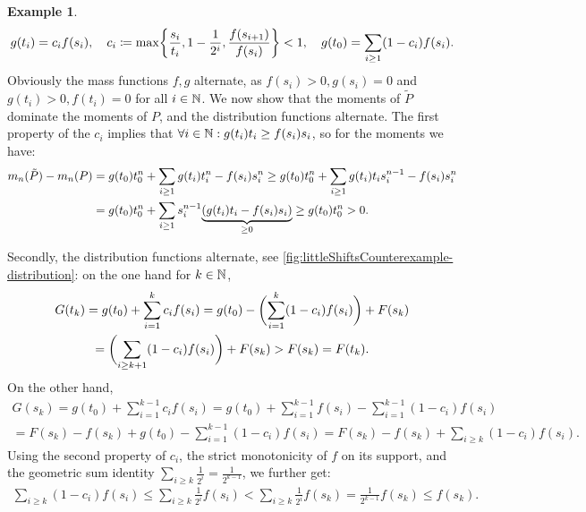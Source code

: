 \documentclass[a4paper]{scrreprt}
\theoremstyle{definition}
\newtheorem{ex}[thm]{Example} %
\begin{document}
\begin{ex}
        \begin{gather*}
            g(t_i) = c_i f(s_i), \quad
            c_i \coloneqq \max\biggset{\frac{s_i}{t_i}, 1-\frac{1}{2^i}, \frac{f(s_{i+1})}{f(s_i)}} < 1, \quad
            g(t_0) = \sum_{i \geq 1} (1-c_i) f(s_i).
        \end{gather*}
        Obviously the mass functions $f, g$ alternate, as $f(s_i) > 0, g(s_i) = 0$ and $g(t_i) > 0, f(t_i) = 0$ for all $i \in \N$. We now show that the moments of $\tilde{P}$ dominate the moments of $P$, and the distribution functions alternate.
        The first property of the $c_i$ implies that $\forall i \in \N: g(t_i)t_i  \geq  f(s_i)s_i$, so for the moments we have:
        \begin{multline*}
            m_n(\tilde{P}) - m_n(P)
            = g(t_0)t_0^n + \sum_{i \geq 1} g(t_i) t_i^n - f(s_i) s_i^n
            \geq g(t_0)t_0^n + \sum_{i \geq 1} g(t_i) t_i s_i^{n-1} - f(s_i) s_i^n  \\
            = g(t_0)t_0^n + \sum_{i \geq 1} s_i^{n-1} \undersetbrace{(g(t_i)t_i - f(s_i)s_i)}{\geq 0}
            \geq g(t_0)t_0^n > 0.
        \end{multline*}
        
        Secondly, the distribution functions alternate, see \autoref{fig:littleShiftsCounterexample-distribution}: on the one hand for $k \in \N$, 
        \begin{multline*}
            G(t_k) 
            = g(t_0) + \sum_{i=1}^k c_i f(s_i) 
            = g(t_0) - \biggpars{\sum_{i=1}^k (1-c_i)f(s_i)} + F(s_k) \\
            = \biggpars{\sum_{i \geq k+1} (1-c_i)f(s_i)} + F(s_k) > F(s_k) = F(t_k).
        \end{multline*}
        On the other hand, 
        \begin{multline*}
            G(s_k)
            = g(t_0) + \sum_{i=1}^{k-1} c_i f(s_i) 
            = g(t_0) + \sum_{i=1}^{k-1} f(s_i) - \sum_{i=1}^{k-1} (1-c_i) f(s_i) \\
            = F(s_k) - f(s_k) + g(t_0) - \sum_{i=1}^{k-1} (1-c_i) f(s_i)  
            = F(s_k) - f(s_k) + \sum_{i \geq k} (1-c_i) f(s_i).
        \end{multline*}
        Using the second property of $c_i$, the strict monotonicity of $f$ on its support, and the geometric sum identity $\sum_{i \geq k} \frac{1}{2^i} = 
        \frac{1}{2^{k-1}}$, we further get:
        \begin{gather*}
            \sum_{i \geq k} (1-c_i)f(s_i) \leq \sum_{i \geq k} \frac{1}{2^i} f(s_i) < \sum_{i \geq k} \frac{1}{2^i} f(s_k) = \frac{1}{2^{k-1}} f(s_k) \leq f(s_k).
        \end{gather*}
        

\end{ex}
\end{document}
